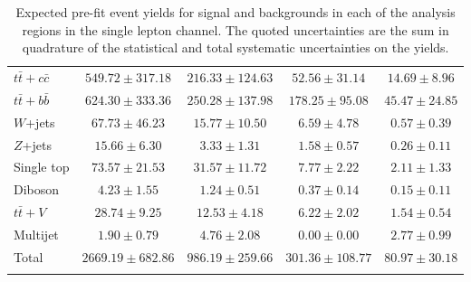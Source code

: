 \begin{table}
\begin{center}
\begin{tabular}{l*{4}{c}}
$t\bar{t}+c\bar{c}$ & $549.72 \pm 317.18$ & $216.33 \pm 124.63$ & $52.56 \pm 31.14$ & $14.69 \pm 8.96$\\
$t\bar{t}+b\bar{b}$ & $624.30 \pm 333.36$ & $250.28 \pm 137.98$ & $178.25 \pm 95.08$ & $45.47 \pm 24.85$\\
$W$+jets & $67.73 \pm 46.23$ & $15.77 \pm 10.50$ & $6.59 \pm 4.78$ & $0.57 \pm 0.39$\\
$Z$+jets & $15.66 \pm 6.30$ & $3.33 \pm 1.31$ & $1.58 \pm 0.57$ & $0.26 \pm 0.11$\\
Single top & $73.57 \pm 21.53$ & $31.57 \pm 11.72$ & $7.77 \pm 2.22$ & $2.11 \pm 1.33$\\
Diboson & $4.23 \pm 1.55$ & $1.24 \pm 0.51$ & $0.37 \pm 0.14$ & $0.15 \pm 0.11$\\
$t\bar{t}+V$ & $28.74 \pm 9.25$ & $12.53 \pm 4.18$ & $6.22 \pm 2.02$ & $1.54 \pm 0.54$\\
Multijet & $1.90 \pm 0.79$ & $4.76 \pm 2.08$ & $0.00 \pm 0.00$ & $2.77 \pm 0.99$\\
\hline
Total & $2669.19 \pm 682.86$          & $986.19 \pm 259.66$          & $301.36 \pm 108.77$          & $80.97 \pm 30.18$         \\
\hline\hline     \\
\end{tabular}
\vspace{0.1cm}

%
\end{center}
\vspace{-0.5cm}
\caption{ 
Expected pre-fit event yields
for signal and backgrounds in each of the analysis regions in the
single lepton channel.
The quoted uncertainties are the sum in quadrature of the statistical and
total systematic uncertainties on the yields.
}
\label{tab:Prefit_Yields_asimov}
\end{table} 
 
